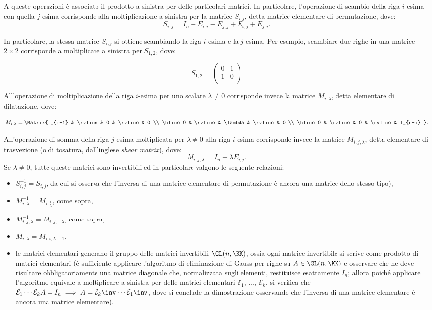 \documentclass[10pt,landscape]{article}
\begin{document}
\begin{multicols}{3}
  		A queste operazioni è associato il prodotto a sinistra per delle particolari matrici. 
		In particolare, l'operazione di scambio della riga $i$-esima con quella $j$-esima corrisponde alla moltiplicazione a sinistra per la matrice $S_{i,j}$, detta matrice
		elementare di permutazione, dove:
		\[ S_{i,j}=I_n-E_{i,i}-E_{j,j}+E_{i,j}+E_{j,i}. \]

		In particolare, la stessa matrice $S_{i,j}$ si ottiene scambiando la riga $i$-esima e la $j$-esima. Per esempio, scambiare due righe in una matrice $2 \times 2$ corrisponde a
		moltiplicare a sinistra per $S_{1,2}$, dove:
		
		\[S_{1,2}=\begin{pmatrix}
			0 & 1 \\
			1 & 0 \\
		\end{pmatrix}\]
		
		All'operazione di moltiplicazione della riga $i$-esima per uno scalare $\lambda \neq 0$ corrisponde invece la matrice $M_{i, \lambda}$, detta elementare di dilatazione, dove:
		
		\[ M_{i,\lambda} = \Matrix{I_{i-1} & \rvline & 0 & \rvline & 0 \\ \hline 0 & \rvline & \lambda & \rvline & 0 \\ \hline 0 & \rvline & 0 & \rvline & I_{n-i} }. \]
		
		All'operazione di somma della riga $j$-esima moltiplicata per $\lambda \neq 0$ alla riga $i$-esima corrisponde invece la matrice $M_{i,j,\lambda}$, detta elementare di trasvezione (o di tosatura, dall'inglese \textit{shear matrix}), dove:
		\[M_{i,j,\lambda}=I_n+\lambda E_{i,j}.\]
		Se $\lambda \neq 0$, tutte queste matrici sono invertibili ed in particolare valgono le seguente relazioni:
		\begin{itemize}
			\item $S_{i,j}^{-1}=S_{i,j}$, da cui si osserva che l'inversa di una matrice elementare di permutazione è ancora una matrice dello stesso tipo),
			\item $M_{i,\lambda}^{-1}=M_{i,\frac{1}{\lambda}}$, come sopra,
			\item $M_{i,j,\lambda}^{-1}=M_{i,j,-\lambda}$, come sopra,
			\item $M_{i,\lambda} = M_{i, i, \lambda-1}$,
			\item le matrici elementari generano il gruppo delle matrici invertibili $\GL(n, \KK)$, ossia ogni matrice
			invertibile si scrive come prodotto di matrici elementari (è sufficiente
			applicare l'algoritmo di eliminazione di Gauss per righe su $A \in \GL(n, \KK)$ e
			osservare che ne deve risultare obbligatoriamente una matrice diagonale che,
			normalizzata sugli elementi, restituisce esattamente $I_n$; allora poiché applicare l'algoritmo
			equivale a moltiplicare a sinistra per delle matrici elementari $\mathcal{E}_1$, ..., $\mathcal{E}_k$, si verifica che $\mathcal{E}_1 \cdots \mathcal{E}_k A = I_n \implies A = \mathcal{E}_k \inv \cdots \mathcal{E}_1 \inv$, dove si
			conclude la dimostrazione osservando che l'inversa di una matrice elementare
			è ancora una matrice elementare).
		\end{itemize}
		

\end{multicols}
\end{document}
